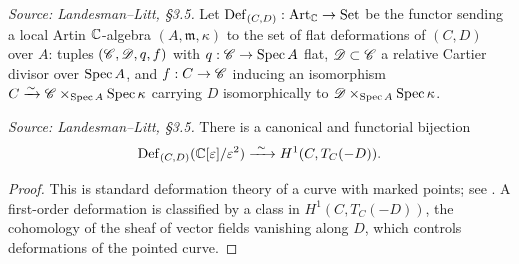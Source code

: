 \begin{definition}
  \label{def:curve-deformation}
  \textit{Source: Landesman--Litt, \S3.5.}
  Let $\operatorname{Def}_{(C,D)}: \operatorname{Art}_{\mathbb{C}} \to \operatorname{Set}$ be the functor sending a local
  Artin $\mathbb{C}$-algebra $(A,\mathfrak{m},\kappa)$ to the set of flat deformations of
  $(C,D)$ over $A$: tuples $(\mathscr{C},\mathscr{D},q,f)$ with $q: \mathscr{C} \to \operatorname{Spec} A$
  flat, $\mathscr{D} \subset \mathscr{C}$ a relative Cartier divisor over $\operatorname{Spec} A$, and
  $f: C \to \mathscr{C}$ inducing an isomorphism $C \xrightarrow{\sim} \mathscr{C} \times_{\operatorname{Spec} A}
  \operatorname{Spec} \kappa$ carrying $D$ isomorphically to $\mathscr{D} \times_{\operatorname{Spec} A}
  \operatorname{Spec} \kappa$.
\end{definition}

\begin{proposition}
  \label{prop:curve-deformation}
  \textit{Source: Landesman--Litt, \S3.5.}
  There is a canonical and functorial bijection
  \[
    \operatorname{Def}_{(C,D)}(\mathbb{C}[\varepsilon]/\varepsilon^2)
    \xrightarrow{\ \sim\ } H^1(C, T_C(-D)).
  \]
\end{proposition}
\begin{proof}
  This is standard deformation theory of a curve with marked points; see
  \cite[Proposition 3.4.17]{sernesi:deformations-of-algebraic-schemes}. A
  first-order deformation is classified by a class in
  $H^1(C, T_C(-D))$, the cohomology of the sheaf of vector fields vanishing along
  $D$, which controls deformations of the pointed curve.
\end{proof}


